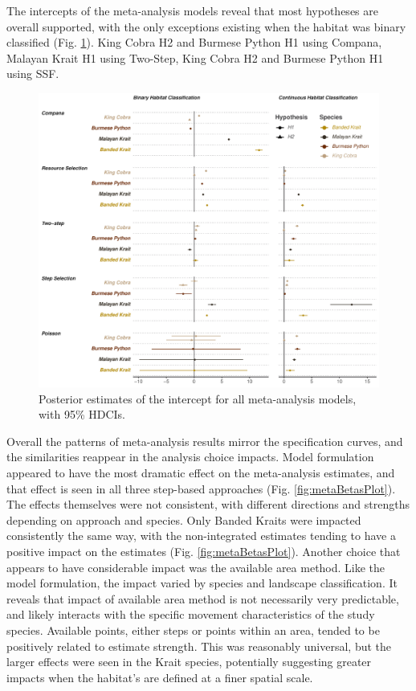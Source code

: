 \documentclass[10pt,a4paper]{article}
\begin{document}
The intercepts of the meta-analysis models reveal that most hypotheses are overall supported, with the only exceptions existing when the habitat was binary classified (Fig. \ref{fig:metaInterPlot}).
King Cobra H2 and Burmese Python H1 using Compana, Malayan Krait H1 using Two-Step, King Cobra H2 and Burmese Python H1 using SSF.

\begin{figure}
\includegraphics[width=1\linewidth]{../../figures/metaIntercept} \caption{Posterior estimates of the intercept for all meta-analysis models, with 95\% HDCIs.}\label{fig:metaInterPlot}
\end{figure}

Overall the patterns of meta-analysis results mirror the specification curves, and the similarities reappear in the analysis choice impacts.
Model formulation appeared to have the most dramatic effect on the meta-analysis estimates, and that effect is seen in all three step-based approaches (Fig. \ref{fig:metaBetasPlot}).
The effects themselves were not consistent, with different directions and strengths depending on approach and species.
Only Banded Kraits were impacted consistently the same way, with the non-integrated estimates tending to have a positive impact on the estimates (Fig. \ref{fig:metaBetasPlot}).
Another choice that appears to have considerable impact was the available area method.
Like the model formulation, the impact varied by species and landscape classification.
It reveals that impact of available area method is not necessarily very predictable, and likely interacts with the specific movement characteristics of the study species.
Available points, either steps or points within an area, tended to be positively related to estimate strength.
This was reasonably universal, but the larger effects were seen in the Krait species, potentially suggesting greater impacts when the habitat's are defined at a finer spatial scale.
\end{document}
